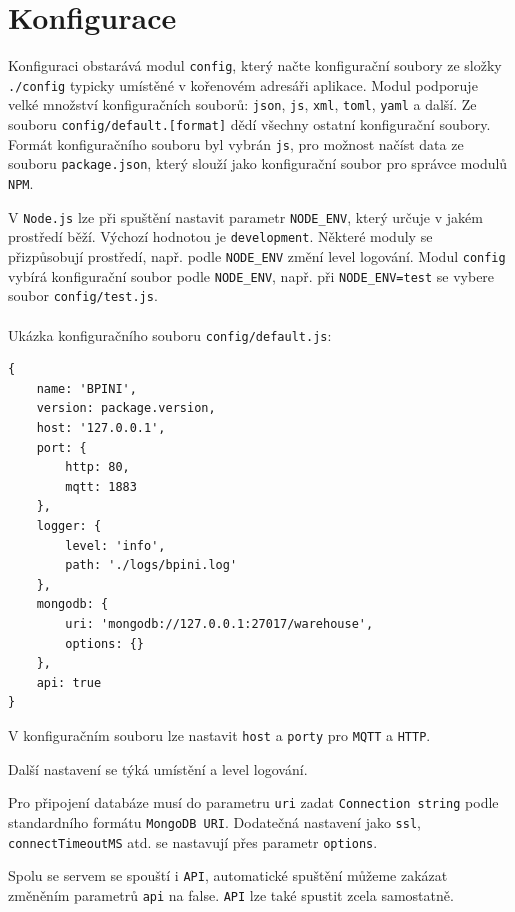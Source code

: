 \documentclass[czech,BP]{thesiskiv}
\begin{document}
	
	
\section{Konfigurace}
		Konfiguraci obstarává modul \texttt{config}, který načte konfigurační soubory ze složky \texttt{./config} typicky umístěné v kořenovém adresáři aplikace. 	
		Modul podporuje velké množství konfiguračních souborů: \texttt{json}, \texttt{js}, \texttt{xml}, \texttt{toml}, \texttt{yaml} a další.
		Ze souboru \texttt{config/default.[format]} dědí všechny ostatní konfigurační soubory.
		Formát konfiguračního souboru byl vybrán \texttt{js}, pro možnost načíst data ze souboru \texttt{package.json}, který slouží jako konfigurační soubor pro správce modulů \texttt{NPM}.	
			
		V \texttt{Node.js} lze při spuštění nastavit parametr \texttt{NODE\_ENV}, který určuje v jakém prostředí běží. Výchozí hodnotou je \texttt{development}.
		Některé moduly se přizpůsobují prostředí, např. podle \texttt{NODE\_ENV} změní level logování. 
		Modul \texttt{config} vybírá konfigurační soubor podle \texttt{NODE\_ENV}, např. při \texttt{NODE\_ENV=test} se vybere soubor \texttt{config/test.js}.
\\\\
		Ukázka konfiguračního souboru \texttt{config/default.js}:	
\begin{verbatim}
{
    name: 'BPINI',
    version: package.version,
    host: '127.0.0.1',
    port: {
        http: 80,
        mqtt: 1883
    },
    logger: {
        level: 'info',
        path: './logs/bpini.log'
    },
    mongodb: {
        uri: 'mongodb://127.0.0.1:27017/warehouse',
        options: {}
    },
    api: true
}
\end{verbatim}
	
	V konfiguračním souboru lze nastavit  \texttt{host} a  \texttt{porty} pro \texttt{MQTT} a \texttt{HTTP}.
	
	Další nastavení se týká umístění a level logování.
	
	Pro připojení databáze musí do parametru \texttt{uri} zadat \texttt{Connection string} podle standardního formátu \texttt{MongoDB URI}.
	Dodatečná nastavení jako \texttt{ssl}, \texttt{connectTimeoutMS} atd. se nastavují přes parametr \texttt{options}.
	
	Spolu se servem se spouští i \texttt{API}, automatické spuštění můžeme zakázat změněním parametrů \texttt{api} na false. 
	\texttt{API} lze také spustit zcela samostatně.	
	
\end{document}
